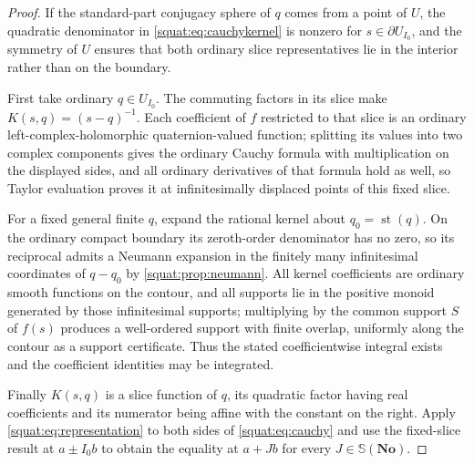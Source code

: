\documentclass[11pt,letterpaper]{article}
\numberwithin{equation}{section}
\theoremstyle{definition}
\theoremstyle{remark}
\newcommand{\No}{\mathbf{No}}
\newcommand{\st}{\operatorname{st}}
\begin{document}
\begin{proof}
If the standard-part conjugacy sphere of $q$ comes from a point of $U$, the quadratic
denominator in \cref{squat:eq:cauchykernel} is nonzero for $s\in\partial U_{I_0}$, and the
symmetry of $U$ ensures that both ordinary slice representatives lie in the interior rather
than on the boundary.

First take ordinary $q\in U_{I_0}$. The commuting factors in its slice make
$K(s,q)=(s-q)^{-1}$. Each coefficient of $f$ restricted to that slice is an ordinary
left-complex-holomorphic quaternion-valued function; splitting its values into two complex
components gives the ordinary Cauchy formula with multiplication on the displayed sides,
and all ordinary derivatives of that formula hold as well, so Taylor evaluation proves it
at infinitesimally displaced points of this fixed slice.

For a fixed general finite $q$, expand the rational kernel about $q_0=\st(q)$. On the
ordinary compact boundary its zeroth-order denominator has no zero, so its reciprocal
admits a Neumann expansion in the finitely many infinitesimal coordinates of $q-q_0$ by
\cref{squat:prop:neumann}. All kernel coefficients are ordinary smooth functions on the
contour, and all supports lie in the positive monoid generated by those infinitesimal
supports; multiplying by the common support $S$ of $f(s)$ produces a well-ordered support
with finite overlap, uniformly along the contour as a support certificate. Thus the stated
coefficientwise integral exists and the coefficient identities may be integrated.

Finally $K(s,q)$ is a slice function of $q$, its quadratic factor having real coefficients
and its numerator being affine with the constant on the right. Apply
\cref{squat:eq:representation} to both sides of \cref{squat:eq:cauchy} and use the
fixed-slice result at $a\pm I_0b$ to obtain the equality at $a+Jb$ for every
$J\in\mathbb S(\No)$.
\end{proof}
\end{document}
